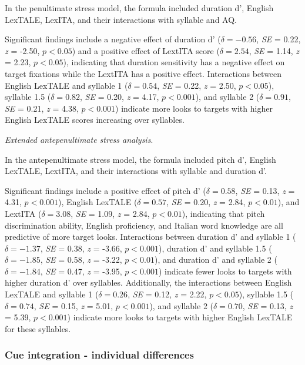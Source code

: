 In the penultimate stress model, the formula included duration d', English LexTALE, LexITA, and their interactions with syllable and AQ. 

Significant findings include a negative effect of duration d' ($\delta = -0.56$, \textit{SE} = 0.22, \textit{z} = -2.50, $p < 0.05$) and a positive effect of LextITA score ($\delta = 2.54$, \textit{SE} = 1.14, \textit{z} = 2.23, $p < 0.05$), indicating that duration sensitivity has a negative effect on target fixations while the LextITA has a positive effect. Interactions between English LexTALE and syllable 1 ($\delta = 0.54$, \textit{SE} = 0.22, \textit{z} = 2.50, $p < 0.05$), syllable 1.5 ($\delta = 0.82$, \textit{SE} = 0.20, \textit{z} = 4.17, $p < 0.001$), and syllable 2 ($\delta = 0.91$, \textit{SE} = 0.21, \textit{z} = 4.38, $p < 0.001$) indicate more looks to targets with higher English LexTALE scores increasing over syllables.

\textit{Extended antepenultimate stress analysis}.

In the antepenultimate stress model, the formula included pitch d', English LexTALE, LextITA, and their interactions with syllable and duration d'. 

Significant findings include a positive effect of pitch d' ($\delta = 0.58$, \textit{SE} = 0.13, \textit{z} = 4.31, $p < 0.001$), English LexTALE ($\delta = 0.57$, \textit{SE} = 0.20, \textit{z} = 2.84, $p < 0.01$), and LextITA ($\delta = 3.08$, \textit{SE} = 1.09, \textit{z} = 2.84, $p < 0.01$), indicating that pitch discrimination ability, English proficiency, and Italian word knowledge are all predictive of more target looks. Interactions between duration d' and syllable 1 ($\delta = -1.37$, \textit{SE} = 0.38, \textit{z} = -3.66, $p < 0.001$), duration d' and syllable 1.5 ($\delta = -1.85$, \textit{SE} = 0.58, \textit{z} = -3.22, $p < 0.01$), and duration d' and syllable 2 ($\delta = -1.84$, \textit{SE} = 0.47, \textit{z} = -3.95, $p < 0.001$) indicate fewer looks to targets with higher duration d' over syllables. Additionally, the interactions between English LexTALE and syllable 1 ($\delta = 0.26$, \textit{SE} = 0.12, \textit{z} = 2.22, $p < 0.05$), syllable 1.5 ($\delta = 0.74$, \textit{SE} = 0.15, \textit{z} = 5.01, $p < 0.001$), and syllable 2 ($\delta = 0.70$, \textit{SE} = 0.13, \textit{z} = 5.39, $p < 0.001$) indicate more looks to targets with higher English LexTALE for these syllables. 

\subsubsection{Cue integration - individual differences}

